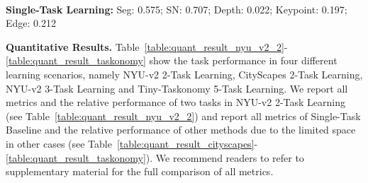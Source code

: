 \begin{table}
\begin{center}
        \caption{\small \textbf{Tiny-Taskonomy 5-Task Learning}. : Semantic Segmentation, : Surface Normal Prediction, : Depth Prediction, : Keypoint Estimation, : Edge Estimation.} \vspace{0.5mm}
        \label{table:quant_result_taskonomy}
        \\
        \vspace{0.5mm}
         {\scriptsize \textbf{Single-Task Learning:} Seg: 0.575; SN: 0.707; Depth: 0.022; Keypoint: 0.197; Edge: 0.212}
    \end{center}
 \vspace{-3mm}
\end{table}
%
 
\textbf{Quantitative Results.} 
Table~\ref{table:quant_result_nyu_v2_2}-\ref{table:quant_result_taskonomy} show the task performance in four different learning scenarios, namely NYU-v2 2-Task Learning, CityScapes 2-Task Learning, NYU-v2 3-Task Learning and Tiny-Taskonomy 5-Task Learning. We report all metrics and the relative performance of two tasks in NYU-v2 2-Task Learning (see Table~\ref{table:quant_result_nyu_v2_2}) and  report all metrics of Single-Task Baseline
and the relative performance of other methods due to the limited space in other cases (see Table~\ref{table:quant_result_cityscapes}-\ref{table:quant_result_taskonomy}). We recommend readers to refer to supplementary material for the full comparison of all metrics.

